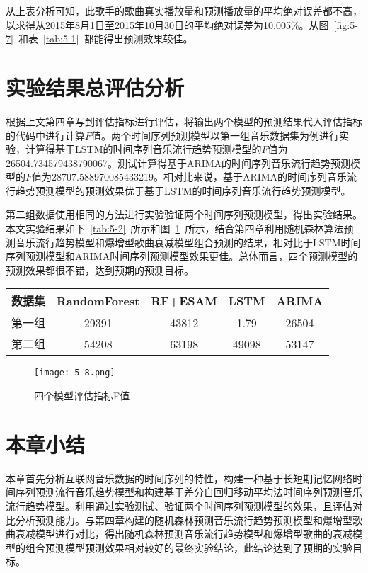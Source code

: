 从上表分析可知，此歌手的歌曲真实播放量和预测播放量的平均绝对误差都不高，以求得从2015年8月1日至2015年10月30日的平均绝对误差为10.005\%。从图~\ref{fig:5-7}~和表~\ref{tab:5-1}~都能得出预测效果较佳。
\section{实验结果总评估分析}
根据上文第四章写到评估指标进行评估，将输出两个模型的预测结果代入评估指标的代码中进行计算$F$值。两个时间序列预测模型以第一组音乐数据集为例进行实验，计算得基于LSTM的时间序列音乐流行趋势预测模型的$F$值为26504.734579438790067。测试计算得基于ARIMA的时间序列音乐流行趋势预测模型的$F$值为28707.588970085433219。相对比来说，基于ARIMA的时间序列音乐流行趋势预测模型的预测效果优于基于LSTM的时间序列音乐流行趋势预测模型。

第二组数据使用相同的方法进行实验验证两个时间序列预测模型，得出实验结果。本文实验结果如下~\ref{tab:5-2}~所示和图~\ref{fig:5-8}~所示，结合第四章利用随机森林算法预测音乐流行趋势模型和爆增型歌曲衰减模型组合预测的结果，相对比于LSTM时间序列预测模型和ARIMA时间序列预测模型效果更佳。总体而言，四个预测模型的预测效果都很不错，达到预期的预测目标。

\begin{table}[htbp]
    \vspace{0.5em}\centering\wuhao
    \begin{tabular}{ccccc}
    \toprule[1.5pt]
    数据集 & RandomForest& RF+ESAM & LSTM & ARIMA\\
    \midrule[1pt]
    第一组 & 29391 & 43812 & 1.79 & 26504\\
    第二组 & 54208 & 63198 &49098 &53147\\
    \bottomrule[1.5pt]
    \end{tabular}
\end{table}

\begin{figure}[htb]
    \centering
\texttt{[image: 5-8.png]}
\caption{四个模型评估指标F值}
\label{fig:5-8}
\end{figure}


\section{本章小结}
本章首先分析互联网音乐数据的时间序列的特性，构建一种基于长短期记忆网络时间序列预测流行音乐趋势模型和构建基于差分自回归移动平均法时间序列预测音乐流行趋势模型。利用通过实验测试、验证两个时间序列预测模型的效果，且评估对比分析预测能力。与第四章构建的随机森林预测音乐流行趋势预测模型和爆增型歌曲衰减模型进行对比，得出随机森林预测音乐流行趋势模型和爆增型歌曲的衰减模型的组合预测模型预测效果相对较好的最终实验结论，此结论达到了预期的实验目标。